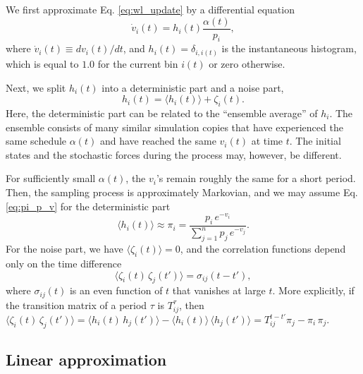 \documentclass[reprint]{revtex4-1}
\begin{document}
We first approximate Eq. \eqref{eq:wl_update}
by a differential equation
%
\begin{equation}
  \dot v_i(t)
  =
  h_i(t) \frac{ \alpha(t) } { p_i },
  \label{eq:vt_diffeq}
\end{equation}
%
where
$\dot v_i(t) \equiv dv_i(t)/dt$,
%
and $h_i(t) = \delta_{i, i(t)}$
is the instantaneous histogram,
which is equal to $1.0$
for the current bin $i(t)$
or zero otherwise.



Next, we split $h_i(t)$ into a deterministic part
and a noise part,
%
\begin{equation}
  h_i(t) = \langle h_i(t) \rangle + \zeta_i(t).
  \label{eq:h_split}
\end{equation}
%
Here, the deterministic part can be related
to the ``ensemble average'' of $h_i$.
%
The ensemble consists of many similar simulation copies
that have experienced the same schedule $\alpha(t)$
and have reached the same $v_i(t)$
at time $t$.
%
The initial states and the stochastic forces
during the process may, however, be different.



For sufficiently small $\alpha(t)$,
the $v_i$'s remain roughly the same for a short period.
%
Then,
the sampling process is approximately Markovian, %
and we may assume Eq. \eqref{eq:pi_p_v}
for the deterministic part
%
\begin{equation}
  \langle h_i(t) \rangle
  \approx
  \pi_i
  =
  \frac{ p_i \, e^{-v_i} }
  { \sum_{j = 1}^n p_j \, e^{-v_j} }.
  \label{eq:h_ave}
\end{equation}
%
%
%
For the noise part, we have
$\langle \zeta_i(t) \rangle = 0$,
%
and the correlation functions
depend only on the time difference
%
\begin{equation}
  \langle \zeta_i(t) \, \zeta_j(t') \rangle
  =
  \sigma_{ij}(t - t'),
  \label{eq:zeta_zeta_correlation}
\end{equation}
%
where $\sigma_{ij}(t)$ is an even function of $t$
that vanishes at large $t$.
%
More explicitly,
if the transition matrix of a period $\tau$
is $T^\tau_{ij}$,
then
$
  \langle \zeta_i(t) \, \zeta_j(t') \rangle
  =
  \langle h_i(t) \, h_j(t') \rangle
  -
  \langle h_i(t) \rangle \, \langle h_j(t') \rangle
  =
  T^{t - t'}_{ij} \pi_j - \pi_i \, \pi_j.
$




\subsection{Linear approximation}
\end{document}

